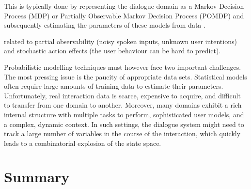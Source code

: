 This is typically done by representing the dialogue domain as a Markov Decision Process (MDP) or Partially Observable Markov Decision Process (POMDP) and subsequently estimating the parameters of these models from data \citep{Supelec270}. 

 related to partial observability (noisy spoken inputs, unknown user intentions) and stochastic action effects (the user behaviour can be hard to predict). 
 
  Probabilistic modelling techniques must however face two important challenges. The most pressing issue is the paucity of appropriate data sets.  Statistical models often require large amounts of training data to estimate their parameters. Unfortunately, real interaction data is scarce, expensive to acquire, and difficult to transfer from one domain to another.  Moreover, many domains exhibit a rich internal structure with multiple tasks to perform, sophisticated user models, and a complex, dynamic context.  In such settings, the dialogue system might need to track a large number of variables in the course of the interaction, which quickly leads to a combinatorial explosion of the state space.  
  

\section{Summary}
